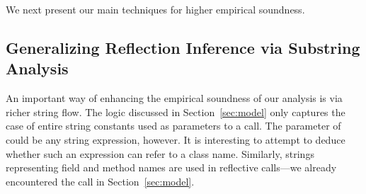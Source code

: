 We next present our main techniques for higher empirical soundness.


\subsection{Generalizing Reflection Inference via Substring Analysis}  
\label{sec:strings}

An important way of enhancing the empirical soundness of our analysis
is via richer string flow. The logic discussed in Section~\ref{sec:model}
only captures the case of entire string constants used as parameters
to a  call. The parameter of  could be any
string expression, however. It is interesting to attempt to deduce
whether such an expression can refer to a class name. Similarly,
strings representing field and method names are used in reflective
calls---we already encountered the  call in
Section~\ref{sec:model}. 


